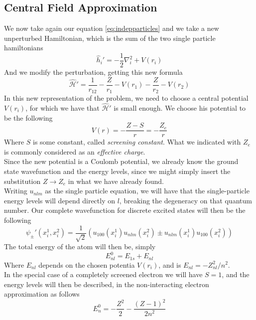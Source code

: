 \documentclass[a4paper, 11pt]{book}
\newcommand{\1}{\opr{\mathds{1}}}
\newcommand{\ham}{\mathcal{H}}
\newcommand{\opr}[1]{\hat{#1}}
\theoremstyle{plain}
\begin{document}
	\subsection{Central Field Approximation}
	We now take again our equation \eqref{eq:indepparticles} and we take a new unperturbed Hamiltonian, which is the sum of the two single particle hamiltonians
	\begin{equation}
		\opr{h}_i'=-\frac{1}{2}\nabla_i^2+V(r_i)
		\label{eq:newsingleparthamind}
	\end{equation}
	And we modify the perturbation, getting this new formula
	\begin{equation}
		\opr{\ham}'=\frac{1}{r_{12}}-\frac{Z}{r_1}-V(r_1)-\frac{Z}{r_2}-V(r_2)
		\label{eq:newpertindel}
	\end{equation}
	In this new representation of the problem, we need to choose a central potential $V(r_i)$, for which we have that $\opr{\ham}'$ is small enough. We choose his potential to be the following
	\begin{equation*}
		V(r)=-\frac{Z-S}{r}=-\frac{Z_e}{r}
	\end{equation*}
	Where $S$ is some constant, called \textit{screening constant}. What we indicated with $Z_e$ is commonly considered as an \textit{effective charge}.\\
	Since the new potential is a Coulomb potential, we already know the ground state wavefunction and the energy levels, since we might simply insert the substitution $Z\to Z_e$ in what we have already found.\\
	Writing $u_{nlm}$ as the single particle equation, we will have that the single-particle energy levels will depend directly on $l$, breaking the degeneracy on that quantum number. Our complete wavefunction for discrete excited states will then be the following
	\begin{equation}
		\psi_{\pm}'(x_i^1,x_i^2)=\frac{1}{\sqrt{2}}\left( u_{100}(x_i^1)u_{nlm}(x_i^2)\pm u_{nlm}(x_i^1)u_{100}(x_i^2) \right)
		\label{eq:generalpsitwononinteminus}
	\end{equation}
	The total energy of the atom will then be, simply
	\begin{equation}
		E^0_{nl}=E_{1s}+E_{nl}
	\end{equation}
	Where $E_{nl}$ depends on the chosen potentia $V(r_i)$, and is $E_{nl}=-Z_{nl}^2/n^2$.\\
	In the special case of a completely screened electron we will have $S=1$, and the energy levels will then be described, in the non-interacting electron approximation as follows
	\begin{equation}
		E_n^0=-\frac{Z^2}{2}-\frac{(Z-1)^2}{2n^2}
		\label{eq:newlevels}
	\end{equation}
\end{document}

